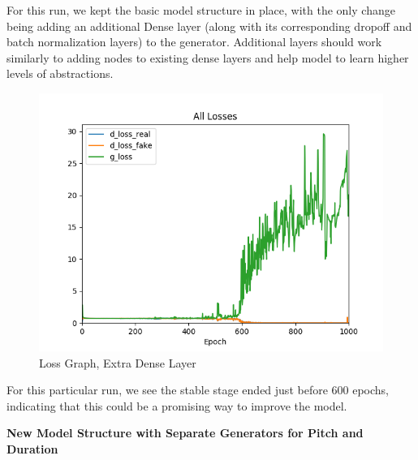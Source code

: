 \documentclass[12pt,oneside]{chicagocapstone}
\begin{document}
For this run, we kept the basic model structure in place, with the only change being adding an additional Dense layer (along with its corresponding dropoff and batch normalization layers) to the generator. Additional layers should work similarly to adding nodes to existing dense layers and help model to learn higher levels of abstractions.
\begin{figure}

{\centering \includegraphics[width=0.8\linewidth]{figure/ap_1pluslayer} 

}

\caption{Loss Graph, Extra Dense Layer}\label{fig:unnamed-chunk-11}
\end{figure}
For this particular run, we see the stable stage ended just before 600 epochs, indicating that this could be a promising way to improve the model.

\textbf{New Model Structure with Separate Generators for Pitch and Duration}
\end{document}
